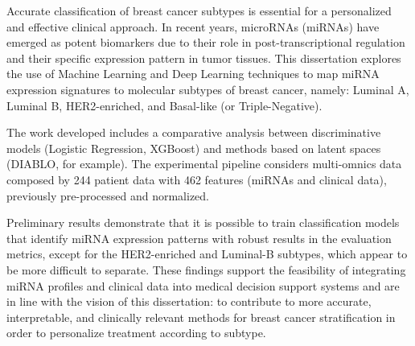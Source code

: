 
%

Accurate classification of breast cancer subtypes is essential for a
personalized and effective clinical approach. In recent years, microRNAs
(miRNAs) have emerged as potent biomarkers due to their role in
post-transcriptional regulation and their specific expression pattern in tumor
tissues. This dissertation explores the use of Machine Learning and Deep
Learning techniques to map miRNA expression signatures to molecular subtypes of
breast cancer, namely: Luminal A, Luminal B, HER2-enriched, and Basal-like (or
Triple-Negative).

The work developed includes a comparative analysis between discriminative
models (Logistic Regression, XGBoost) and methods based on latent spaces
(DIABLO, for example). The experimental pipeline considers multi-omnics data
composed by 244 patient data with 462 features (miRNAs and clinical data),
previously pre-processed and normalized.

Preliminary results demonstrate that it is possible to train classification
models that identify miRNA expression patterns with robust results in the
evaluation metrics, except for the HER2-enriched and Luminal-B subtypes, which
appear to be more difficult to separate. These findings support the feasibility
of integrating miRNA profiles and clinical data into medical decision support
systems and are in line with the vision of this dissertation: to contribute to
more accurate, interpretable, and clinically relevant methods for breast cancer
stratification in order to personalize treatment according to subtype.

